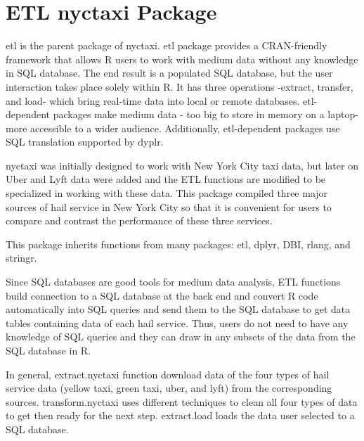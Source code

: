 \documentclass[12pt,twoside]{reedthesis}
\theoremstyle{definition}
\theoremstyle{definition}
\theoremstyle{definition}
\theoremstyle{remark}
\begin{document}
\section{ETL nyctaxi Package}\label{etl-nyctaxi-package}

etl is the parent package of nyctaxi. etl package provides a
CRAN-friendly framework that allows R users to work with medium data
without any knowledge in SQL database. The end result is a populated SQL
database, but the user interaction takes place solely within R. It has
three operations -extract, transfer, and load- which bring real-time
data into local or remote databases. etl-dependent packages make medium
data - too big to store in memory on a laptop- more accessible to a
wider audience. Additionally, etl-dependent packages use SQL translation
supported by dyplr.

nyctaxi was initially designed to work with New York City taxi data, but
later on Uber and Lyft data were added and the ETL functions are
modified to be specialized in working with these data. This package
compiled three major sources of hail service in New York City so that it
is convenient for users to compare and contrast the performance of these
three services.

This package inherits functions from many packages: etl, dplyr, DBI,
rlang, and stringr.

Since SQL databases are good tools for medium data analysis, ETL
functions build connection to a SQL database at the back end and convert
R code automatically into SQL queries and send them to the SQL database
to get data tables containing data of each hail service. Thus, users do
not need to have any knowledge of SQL queries and they can draw in any
subsets of the data from the SQL database in R.

In general, extract.nyctaxi function download data of the four types of
hail service data (yellow taxi, green taxi, uber, and lyft) from the
corresponding sources. transform.nyctaxi uses different techniques to
clean all four types of data to get then ready for the next step.
extract.load loads the data user selected to a SQL database.
\end{document}

